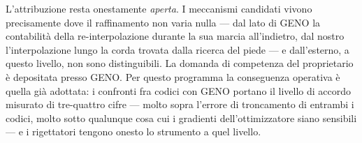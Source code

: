 L'attribuzione resta onestamente \emph{aperta}. I meccanismi
candidati vivono precisamente dove il raffinamento non varia nulla
--- dal lato di GENO la contabilità della re-interpolazione durante
la sua marcia all'indietro, dal nostro l'interpolazione lungo la
corda trovata dalla ricerca del piede --- e dall'esterno, a questo
livello, non sono distinguibili. La domanda di competenza del
proprietario è depositata presso GENO. Per questo programma la
conseguenza operativa è quella già adottata: i confronti fra codici
con GENO portano il livello di accordo misurato di tre-quattro cifre
--- molto sopra l'errore di troncamento di entrambi i codici, molto
sotto qualunque cosa cui i gradienti dell'ottimizzatore siano
sensibili --- e i rigettatori tengono onesto lo strumento a quel
livello.
